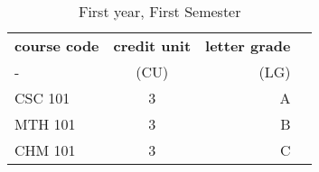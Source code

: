 \documentclass{article}
\begin{document}
	\begin{table}[h!]
		\begin{center}
			\caption{First year, First Semester}
			\label{tab:table1}
			\begin{tabular}{l|c|r|c}
				\textbf{course code}& \textbf{credit unit} & 
				\textbf{letter grade}\\
				- & (CU) & (LG) \\
				\hline
				CSC 101 & 3 & A\\
				MTH 101 & 3 & B\\
				CHM 101 & 3 & C\\
				\end{tabular}
			\end{center}
		\end{table}
\end{document}
